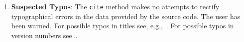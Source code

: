 \documentclass[11pt]{article}
\begin{document}
\begin{enumerate}
	\item \textbf{Suspected Typos}: The \texttt{cite} method makes no attempts to rectify typographical errors in the data provided by the source code. The user has been warned. For possible typos in titles see, e.g.,~\cite{BrunsSource,HigherCIOperatorsSource,MarkovSource}. For possible typos in version numbers see~\cite{DivisorSource}.

\end{enumerate}


\nocite{*}
{}

\end{document}
